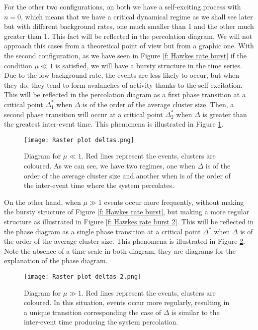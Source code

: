 For the other two configurations, on both we have a self-exciting process with $n=0$, which means that we have a critical dynamical regime as we shall see later but with different background 
rates, one much smaller than 1 and the other much greater than 1. This fact will be reflected in the percolation diagram. We will not approach this cases from a theoretical point of view
but from a graphic one. With the second configuration, as we have seen in Figure \ref{f: Hawkes rate burst} if the condition $\mu\ll 1$ is satisfied, we will have a bursty structure in the 
time series. Due to the low background rate, the events are less likely to occur, but when they do, they tend to form avalanches of activity thanks to the self-excitation. This will be
reflected in the percolation diagram as a first phase transition at a critical point $\Delta^*_1$ when $\Delta$ is of the order of the average cluster size. Then, a second phase transition
will occur at a critical point $\Delta^*_2$ when $\Delta$ is greater than the greatest inter-event time. This phenomena is illustrated in Figure \ref{f: Delta percolación}.

\begin{figure}[H]
    \centering
    \texttt{[image: Raster plot deltas.png]}
    \caption{Diagram for $\mu\ll 1$. Red lines represent the events, clusters are coloured. As we can see, we have two regimes, one when $\Delta$ is of the order of the average 
    cluster size and another when is of the order of the inter-event time where the system percolates.}
    \label{f: Delta percolación}
\end{figure}

On the other hand, when $\mu\gg 1$ events occur more frequently, without making the bursty structure of Figure \ref{f: Hawkes rate burst}, but making a more regular structure as
illustrated in Figure \ref{f: Hawkes rate burst 2}. This will be reflected in the phase diagram as a single phase transition at a critical point $\Delta^*$ when $\Delta$ is of the order of
the average cluster size. This phenomena is illustrated in Figure \ref{f: Delta percolación 2}. Note the absence of a time scale in both diagram, they are diagrams for the explanation of 
the phase diagram.

\begin{figure}[H]
    \centering
    \texttt{[image: Raster plot deltas 2.png]}
    \caption{Diagram for $\mu\gg1$. Red lines represent the events, clusters are coloured. In this situation, events occur more regularly, resulting in a unique transition corresponding 
    the case of $\Delta$ is similar to the inter-event time producing the system percolation.}
    \label{f: Delta percolación 2}
\end{figure}

